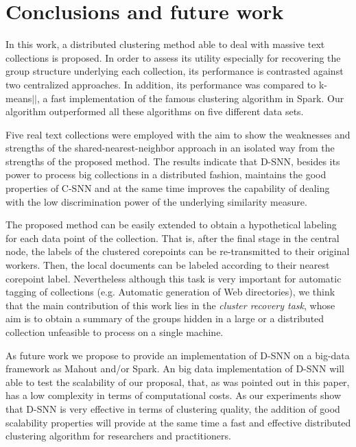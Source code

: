 \documentclass[preprint,12pt,authoryear,review]{elsarticle}
\begin{document}
\section{Conclusions and future work}
\label{sec:conc}

In this work, a distributed clustering method able to deal with massive text collections is proposed. In order to assess its utility especially for recovering the group structure underlying each collection, its performance is contrasted against two centralized approaches.
In addition, its performance was compared to k-means$||$, a fast implementation of the famous clustering algorithm in Spark. Our algorithm outperformed all these algorithms on five different data sets.  

Five real text collections were employed with the aim to show the weaknesses and strengths of the shared-nearest-neighbor approach in an isolated way from the strengths of the proposed method. The results indicate that D-SNN, besides its power to process big collections in a distributed fashion, maintains the good properties of C-SNN and at the same time improves the capability of dealing with the low discrimination power of the underlying similarity measure. 

The proposed method can be easily extended to obtain a hypothetical labeling for each data point of the collection. That is, after the final stage in the central node, the labels of the clustered corepoints can be re-transmitted to their original workers. Then, the local documents can be labeled according to their nearest corepoint label.
Nevertheless although this task is very important for automatic tagging of collections (e.g. Automatic generation of Web directories), we think that the main contribution of this work lies in the \textit{cluster recovery task}, whose aim is to obtain a summary of the groups hidden in a large or a distributed collection unfeasible to process on a single machine. 

As future work we propose to provide an implementation of D-SNN on a big-data framework as Mahout and/or Spark. An big data implementation of D-SNN will able to test the scalability of our proposal, that, as was pointed out in this paper, has a low complexity in terms of computational costs. As our experiments show that D-SNN is very effective in terms of clustering quality, the addition of good scalability properties will provide at the same time a fast and effective distributed clustering algorithm for researchers and practitioners. 
\end{document}
